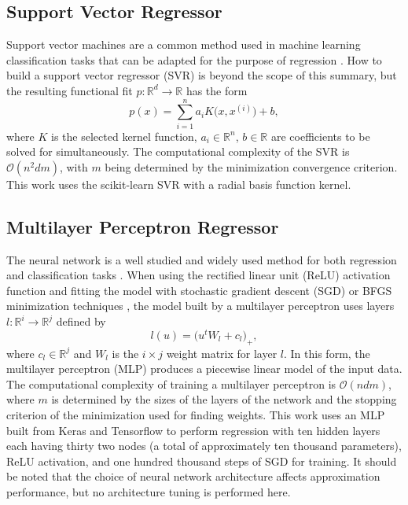 \subsection{Support Vector Regressor}
\label{sec:svr}
Support vector machines are a common method used in machine learning
classification tasks that can be adapted for the purpose of regression
\cite{basak2007support}. How to build a support vector regressor (SVR)
is beyond the scope of this summary, but the resulting functional fit
$p : \mathbb{R}^d \rightarrow \mathbb{R}$ has the form
 $$ p(x)  = \sum_{i=1}^{n}a_i K\bigl(x,x^{(i)}\bigr) + b ,$$
where $K$ is the selected kernel function, $a_i \in \mathbb{R}^n$, 
$b \in \mathbb{R}$ are coefficients to be solved for simultaneously.
The computational complexity of the SVR is $\mathcal{O}(n^2dm)$, with
$m$ being determined by the minimization convergence criterion. This
work uses the scikit-learn SVR \cite{scikit-learn} with a radial
basis function kernel.

\subsection{Multilayer Perceptron Regressor}
\label{sec:mlp}
The neural network is a well studied and widely used method for both
regression and classification tasks
\cite{hornik1989multilayer,rumelhart1988learning}. When using the
rectified linear unit (ReLU) activation function
\cite{dahl2013improving} and fitting the model with stochastic
gradient descent (SGD) or BFGS minimization techniques
\cite{goh2017why,moller1993scaled,robbins1951stochastic}, the model
built by a multilayer perceptron uses layers $l : \mathbb{R}^{i}
\rightarrow \mathbb{R}^{j}$ defined by
 $$ l(u) = \bigl( u^t W_l + c_l \bigr)_+ ,$$
where $c_l \in \mathbb{R}^j$ and $W_l$ is the $i \times j$ weight
matrix for layer $l$. In this form, the multilayer perceptron (MLP)
produces a piecewise linear model of the input data. The computational
complexity of training a multilayer perceptron is $\mathcal{O}(n d
m)$, where $m$ is determined by the sizes of the layers of the network
and the stopping criterion of the minimization used for finding
weights. This work uses an MLP built from Keras and Tensorflow to
perform regression \cite{tensorflow2015-whitepaper,chollet2015keras}
with ten hidden layers each having thirty two nodes (a total of
approximately ten thousand parameters), ReLU activation, and
one hundred thousand steps of SGD
for training. It should be noted that the choice of neural
  network architecture affects approximation performance, but no
  architecture tuning is performed here.

